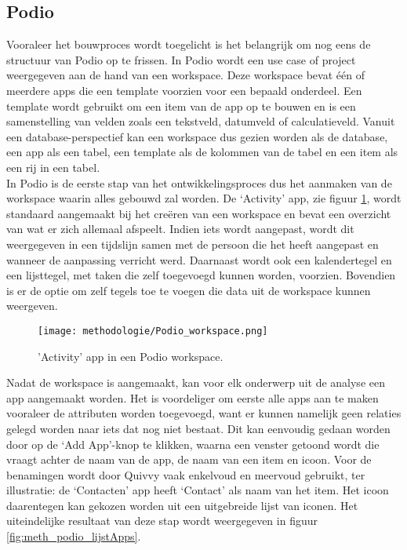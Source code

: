 \subsection{Podio} 

Vooraleer het bouwproces wordt toegelicht is het belangrijk om nog eens de structuur van Podio op te frissen. In Podio wordt een use case of project weergegeven aan de hand van een workspace. Deze workspace bevat één of meerdere apps die een template voorzien voor een bepaald onderdeel. Een template wordt gebruikt om een item van de app op te bouwen en is een samenstelling van velden zoals een tekstveld, datumveld of calculatieveld. Vanuit een database-perspectief kan een workspace dus gezien worden als de database, een app als een tabel, een template als de kolommen van de tabel en een item als een rij in een tabel. \\

In Podio is de eerste stap van het ontwikkelingsproces dus het aanmaken van de workspace waarin alles gebouwd zal worden. De ‘Activity’ app, zie figuur \ref{fig:meth_podio_workspace}, wordt standaard aangemaakt bij het creëren van een workspace en bevat een overzicht van wat er zich allemaal afspeelt. Indien iets wordt aangepast, wordt dit weergegeven in een tijdslijn samen met de persoon die het heeft aangepast en wanneer de aanpassing verricht werd. Daarnaast wordt ook een kalendertegel en een lijsttegel, met taken die zelf toegevoegd kunnen worden, voorzien. Bovendien is er de optie om zelf tegels toe te voegen die data uit de workspace kunnen weergeven. \\

\begin{figure}[h]
    \centering
    \texttt{[image: methodologie/Podio\_workspace.png]}
    \caption{'Activity' app in een Podio workspace.}
    \label{fig:meth_podio_workspace}
\end{figure}

Nadat de workspace is aangemaakt, kan voor elk onderwerp uit de analyse een app aangemaakt worden. Het is voordeliger om eerste alle apps aan te maken vooraleer de attributen worden toegevoegd, want er kunnen namelijk geen relaties gelegd worden naar iets dat nog niet bestaat. Dit kan eenvoudig gedaan worden door op de ‘Add App’-knop te klikken, waarna een venster getoond wordt die vraagt achter de naam van de app, de naam van een item en icoon. Voor de benamingen wordt door Quivvy vaak enkelvoud en meervoud gebruikt, ter illustratie: de ‘Contacten’ app heeft ‘Contact’ als naam van het item. Het icoon daarentegen kan gekozen worden uit een uitgebreide lijst van iconen. Het uiteindelijke resultaat van deze stap wordt weergegeven in figuur \ref{fig:meth_podio_lijstApps}. \\

